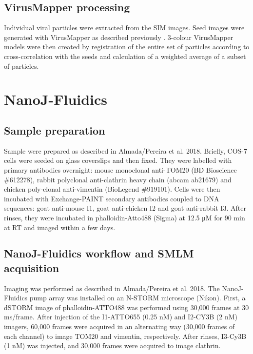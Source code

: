 
\subsection{VirusMapper processing}

Individual viral particles were extracted from the SIM images. Seed images were generated with VirusMapper as described previously \cite{Gray2016}. 3-colour VirusMapper models were then created by registration of the entire set of particles according to cross-correlation with the seeds and calculation of a weighted average of a subset of particles. 



\section{NanoJ-Fluidics}

\subsection{Sample preparation}

Sample were prepared as described in Almada/Pereira et al. 2018. Briefly, COS-7 cells were seeded on glass coverslips and then fixed. They were labelled with primary antibodies overnight: mouse monoclonal anti-TOM20 (BD Bioscience \#612278), rabbit polyclonal anti-clathrin heavy chain (abcam ab21679) and chicken poly-clonal anti-vimentin (BioLegend \#919101). Cells were then incubated with Exchange-PAINT secondary antibodies coupled to DNA sequences: goat anti-mouse I1, goat anti-chicken I2 and goat anti-rabbit I3. After rinses, they were incubated in phalloidin-Atto488 (Sigma) at 12.5 μM for 90 min at RT and imaged within a few days. 

\subsection{NanoJ-Fluidics workflow and SMLM acquisition}

Imaging was performed as described in Almada/Pereira et al. 2018. The NanoJ-Fluidics pump array was installed on an N-STORM microscope (Nikon). First, a dSTORM image of phalloidin-ATTO488 was performed using 30,000 frames at 30 ms/frame. After injection of the I1-ATTO655 (0.25 nM) and I2-CY3B (2 nM) imagers, 60,000 frames were acquired in an alternating way (30,000 frames of each channel) to image TOM20 and vimentin, respectively. After rinses, I3-Cy3B (1 nM) was injected, and 30,000 frames were acquired to image clathrin.

